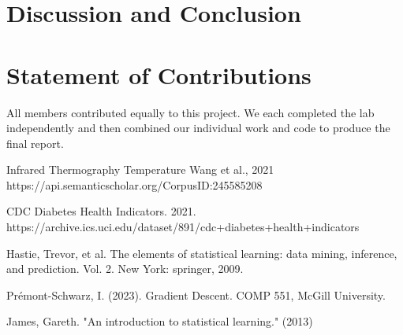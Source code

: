 \documentclass{article}
\begin{document}
\section{Discussion and Conclusion}



\section{Statement of Contributions}

All members contributed equally to this project. We each completed the lab independently and then combined our individual work and code to produce the final report.

\newpage
  

\begin{thebibliography}{1}

 Infrared Thermography Temperature
Wang et al., 2021
https://api.semanticscholar.org/CorpusID:245585208
\label{ref:dataset1}

 CDC Diabetes Health Indicators. 2021. https://archive.ics.uci.edu/dataset/891/cdc+diabetes+health+indicators \label{ref:dataset2}

 Hastie, Trevor, et al. The elements of statistical learning: data mining, inference, and prediction. Vol. 2. New York: springer, 2009. \label{statistical learning}

 Prémont-Schwarz, I. (2023). Gradient Descent. COMP 551, McGill University.\label{ref:lectures}

 James, Gareth. "An introduction to statistical learning." (2013) \label{ref:validation}

\end{thebibliography}
\end{document}
